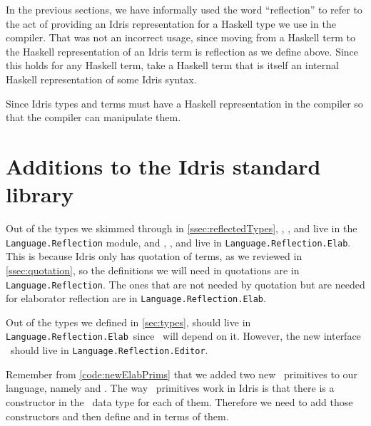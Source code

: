 
In the previous sections, we have informally used the word ``reflection'' to
refer to the act of providing an Idris representation for a Haskell type we use
in the compiler.  That was not an incorrect usage, since moving from a Haskell
term to the Haskell representation of an Idris term is reflection as we define
above. Since this holds for any Haskell term, take a Haskell term that is
itself an internal Haskell representation of some Idris syntax.

Since Idris types and terms must have a Haskell representation in the compiler so that the compiler can manipulate them.
\section{Additions to the Idris standard library}\label{sec:stdlib}

\newcommand{\LR}{\texttt{Language.Reflection}}
\newcommand{\LRE}{\texttt{Language.Reflection.Elab}}
\newcommand{\LREd}{\texttt{Language.Reflection.Editor}}

Out of the types we skimmed through in \autoref{ssec:reflectedTypes}, \TT,
\Raw, and  live in the \texttt{Language.Reflection} module, and
, , and  live in \LRE. This is because
Idris only has quotation of terms, as we reviewed in \autoref{ssec:quotation},
so the definitions we will need in quotations are in \LR. The ones that are not
needed by quotation but are needed for elaborator reflection are in \LRE.

Out of the types we defined in \autoref{sec:types},  should live in
\LRE\ since \Elab\ will depend on it. However, the new interface
\Editorable\ should live in \LREd.

Remember from \autoref{code:newElabPrims} that we added two new
\Elab\ primitives to our language, namely  and
.
The way \Elab\ primitives work in Idris is that there is a constructor in the
\Elab\ data type for each of them. Therefore we need to add those constructors
and then define  and  in terms of
them.

